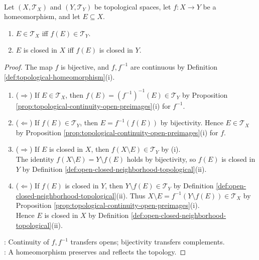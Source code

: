 \begin{proposition} \label{prop:homeomorphism-preserves-open-and-closed-sets} \\
Let $(X,\mathcal{T}_X)$ and $(Y,\mathcal{T}_Y)$ be topological spaces, let $f:X\to Y$ be a homeomorphism, and let $E\subseteq X$.
\begin{enumerate}[label=(\roman*)]
\setlength{\itemsep}{0pt}
\item $E\in\mathcal{T}_X$ iff $f(E)\in\mathcal{T}_Y$.
\item $E$ is closed in $X$ iff $f(E)$ is closed in $Y$.
\end{enumerate}
\begin{proof}
The map $f$ is bijective, and $f,f^{-1}$ are continuous by Definition \ref{def:topological-homeomorphism}(i).
\begin{enumerate}[label=(\roman*)]
\setlength{\itemsep}{0pt}
\item[$(i)$] ($\Rightarrow$) If $E\in\mathcal{T}_X$, then $f(E)=(f^{-1})^{-1}(E)\in\mathcal{T}_Y$ by Proposition \ref{prop:topological-continuity-open-preimages}(i) for $f^{-1}$.
\item[$(i)$] ($\Leftarrow$) If $f(E)\in\mathcal{T}_Y$, then $E=f^{-1}(f(E))$ by bijectivity. Hence $E\in\mathcal{T}_X$ by Proposition \ref{prop:topological-continuity-open-preimages}(i) for $f$.
\item[$(ii)$] ($\Rightarrow$) If $E$ is closed in $X$, then $f(X\setminus E)\in\mathcal{T}_Y$ by (i).\\
The identity $f(X\setminus E)=Y\setminus f(E)$ holds by bijectivity, so $f(E)$ is closed in $Y$ by Definition \ref{def:open-closed-neighborhood-topological}(ii).
\item[$(ii)$] ($\Leftarrow$) If $f(E)$ is closed in $Y$, then $Y\setminus f(E)\in\mathcal{T}_Y$ by Definition \ref{def:open-closed-neighborhood-topological}(ii). Thus $X\setminus E=f^{-1}(Y\setminus f(E))\in\mathcal{T}_X$ by Proposition \ref{prop:topological-continuity-open-preimages}(i).\\
Hence $E$ is closed in $X$ by Definition \ref{def:open-closed-neighborhood-topological}(ii).
\end{enumerate}
: Continuity of $f,f^{-1}$ transfers opens; bijectivity transfers complements.\\
: A homeomorphism preserves and reflects the topology.
\end{proof}
\end{proposition}


